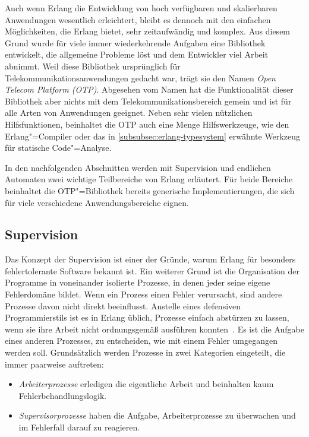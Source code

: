 Auch wenn Erlang die Entwicklung von hoch verfügbaren und skalierbaren Anwendungen wesentlich erleichtert, bleibt es dennoch mit den einfachen Möglichkeiten, die Erlang bietet, sehr zeitaufwändig und komplex. Aus diesem Grund wurde für viele immer wiederkehrende Aufgaben eine Bibliothek entwickelt, die allgemeine Probleme löst und dem Entwickler viel Arbeit abnimmt.  Weil diese Bibliothek ursprünglich für Telekommunikationsanwendungen gedacht war, trägt sie den Namen \textit{Open Telecom Platform (OTP)}. Abgesehen vom Namen hat die Funktionalität dieser Bibliothek aber nichts mit dem Telekommunikationsbereich gemein und ist für alle Arten von Anwendungen geeignet. Neben sehr vielen nützlichen Hilfsfunktionen, beinhaltet die OTP auch eine Menge Hilfswerkzeuge, wie \zB den Erlang"=Compiler oder das in \ref{subsubsec:erlang-typesystem} erwähnte Werkzeug für statische Code"=Analyse.

In den nachfolgenden Abschnitten werden mit Supervision und endlichen Automaten zwei wichtige Teilbereiche von Erlang erläutert. Für beide Bereiche beinhaltet die OTP"=Bibliothek bereits generische Implementierungen, die sich für viele verschiedene Anwendungsbereiche eignen. 

\subsection{Supervision}
\label{subsec:erlang-supervision}

Das Konzept der Supervision ist einer der Gründe, warum 
Erlang für besonders fehlertolerante Software bekannt ist. Ein weiterer Grund ist die Organisation der Programme in voneinander isolierte Prozesse, in denen jeder seine eigene Fehlerdomäne bildet. Wenn ein Prozess einen Fehler verursacht, sind andere Prozesse davon nicht direkt beeinflusst. Anstelle eines defensiven Programmierstils ist es in Erlang üblich, Prozesse einfach abstürzen zu lassen, wenn sie ihre Arbeit nicht ordnungsgemäß ausführen konnten~\cite[104]{armstrong03}. Es ist die Aufgabe eines anderen Prozesses, zu entscheiden, wie mit einem Fehler umgegangen werden soll. Grundsätzlich werden Prozesse in zwei Kategorien eingeteilt, die immer paarweise auftreten:

\begin{itemize}
	\item \textit{Arbeiterprozesse} erledigen die eigentliche Arbeit und beinhalten kaum Fehlerbehandlungslogik.
	\item \textit{Supervisorprozesse} haben die Aufgabe, Arbeiterprozesse zu überwachen und im Fehlerfall darauf zu reagieren.
\end{itemize}

